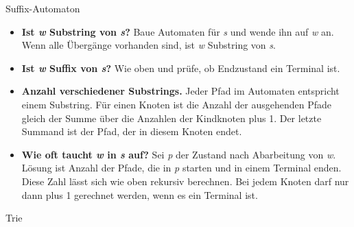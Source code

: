 \begin{algorithm}{Suffix-Automaton}
	\begin{itemize}
		\item \textbf{Ist \textit{w} Substring von \textit{s}?}
		Baue Automaten für \textit{s} und wende ihn auf \textit{w} an.
		Wenn alle Übergänge vorhanden sind, ist \textit{w} Substring von \textit{s}.
	
		\item \textbf{Ist \textit{w} Suffix von \textit{s}?}
		Wie oben und prüfe, ob Endzustand ein Terminal ist.
	
		\item \textbf{Anzahl verschiedener Substrings.}
		Jeder Pfad im Automaten entspricht einem Substring.
		Für einen Knoten ist die Anzahl der ausgehenden Pfade gleich der Summe über die Anzahlen der Kindknoten plus 1.
		Der letzte Summand ist der Pfad, der in diesem Knoten endet.
	
		\item \textbf{Wie oft taucht \textit{w} in \textit{s} auf?}
		Sei \textit{p} der Zustand nach Abarbeitung von \textit{w}.
		Lösung ist Anzahl der Pfade, die in \textit{p} starten und in einem Terminal enden.
		Diese Zahl lässt sich wie oben rekursiv berechnen.
		Bei jedem Knoten darf nur dann plus 1 gerechnet werden, wenn es ein Terminal ist.
	\end{itemize}
\end{algorithm}

\begin{algorithm}{Trie}
\end{algorithm}
